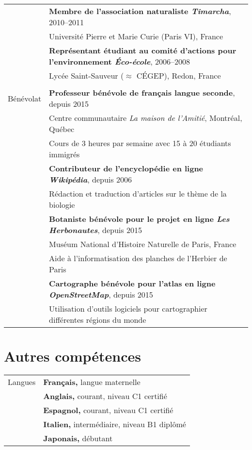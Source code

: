 \documentclass[letterpaper,10pt]{article}
\begin{document}
{\begin{tabular}{r|p{14cm}}
  & \textbf{Membre de l'association naturaliste \emph{Timarcha}}, 2010--2011 \\
  & Université Pierre et Marie Curie (Paris VI), France \vspace{2mm}\\

  & \textbf{Représentant étudiant au comité d'actions pour l'environnement \emph{Éco-école}}, 2006--2008 \\
  & Lycée Saint-Sauveur ($\approx$ CÉGEP), Redon, France\\
  
  
\multicolumn{2}{c}{} \\

Bénévolat & \textbf{Professeur bénévole de français langue seconde}, depuis 2015 \\
 & Centre communautaire \emph{La maison de l'Amitié}, Montréal, Québec\\
 & \textbullet{} Cours de 3 heures par semaine avec 15 à 20 étudiants immigrés  \vspace{2mm} \\
 
 & \textbf{Contributeur de l'encyclopédie en ligne \emph{Wikipédia}}, depuis 2006 \\
 & \textbullet{} Rédaction et traduction d'articles sur le thème de la biologie  \vspace{2mm} \\
 
 & \textbf{Botaniste bénévole pour le projet en ligne \emph{Les Herbonautes}}, depuis 2015 \\
 & Muséum National d'Histoire Naturelle de Paris, France \\
 & \textbullet{} Aide à l'informatisation des planches de l'Herbier de Paris \vspace{2mm}\\
 
 & \textbf{Cartographe bénévole pour l'atlas en ligne \emph{OpenStreetMap}}, depuis 2015 \\
 & \textbullet{} Utilisation d'outils logiciels pour cartographier différentes régions du monde \\
\end{tabular}

\vspace{8mm}

\section{Autres compétences}
\begin{tabular}{r|p{14cm}}	
Langues  & \textbf{Français,} langue maternelle\\
 & \textbf{Anglais,} courant, niveau C1 certifié\\
 & \textbf{Espagnol,} courant, niveau C1 certifié\\
 & \textbf{Italien,} intermédiaire, niveau B1 diplômé\\
 & \textbf{Japonais,} débutant\\


\end{tabular}}
\end{document}
